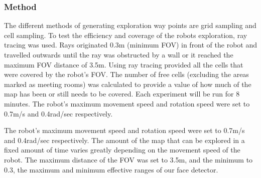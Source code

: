 \documentclass[conference]{IEEEtran}
\begin{document}
\subsubsection{Method}
The different methods of generating exploration way points are grid sampling and cell sampling. To test the efficiency and coverage of the robots exploration, ray tracing was used. Rays originated 0.3m (minimum FOV) in front of the robot and travelled outwards until the ray was obstructed by a wall or it reached the maximum FOV distance of 3.5m. Using ray tracing provided all the cells that were covered by the robot’s FOV. The number of free cells (excluding the areas marked as meeting rooms) was calculated to provide a value of how much of the map has been or still needs to be covered.  Each experiment will be run for 8 minutes. The robot’s maximum movement speed and rotation speed were set to 0.7m/s and 0.4rad/sec respectively. 

The robot's maximum movement speed and rotation speed were set to 0.7m/s and 0.4rad/sec respectively. The amount of the map that can be explored in a fixed amount of time varies greatly depending on the movement speed of the robot. The maximum distance of the FOV was set to 3.5m, and the minimum to 0.3, the maximum and minimum effective ranges of our face detector.
\end{document}
